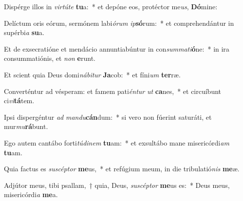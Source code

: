 \item Dispérge illos in \textit{vir}\textit{tú}\textit{te} \textbf{tu}a:~* et depóne eos, protéctor me\textit{us}, \textbf{Dó}mine:
\item Delíctum oris eórum, sermónem labi\textit{ó}\textit{rum} \textit{ip}\textbf{só}rum:~* et comprehendántur in supérbi\textit{a} \textbf{su}a.
\item Et de exsecratióne et mendácio annuntiabúntur in con\textit{sum}\textit{ma}\textit{ti}\textbf{ó}ne:~* in ira consummatiónis, et \textit{non} \textbf{e}runt.
\item Et scient quia Deus domi\textit{ná}\textit{bi}\textit{tur} \textbf{Ja}cob:~* et fíni\textit{um} \textbf{ter}ræ.
\item Converténtur ad vésperam: et famem pati\textit{én}\textit{tur} \textit{ut} \textbf{ca}nes,~* et circuíbunt ci\textit{vi}\textbf{tá}tem.
\item Ipsi dispergéntur \textit{ad} \textit{man}\textit{du}\textbf{cán}dum:~* si vero non fúerint saturáti, et mur\textit{mu}\textbf{rá}bunt.
\item Ego autem cantábo forti\textit{tú}\textit{di}\textit{nem} \textbf{tu}am:~* et exsultábo mane misericórdi\textit{am} \textbf{tu}am.
\item Quia factus es \textit{su}\textit{scép}\textit{tor} \textbf{me}us,~* et refúgium meum, in die tribulatió\textit{nis} \textbf{me}æ.
\item Adjútor meus, tibi psallam,~† quia, Deus, \textit{su}\textit{scép}\textit{tor} \textbf{me}us es:~* Deus meus, misericórdi\textit{a} \textbf{me}a.

